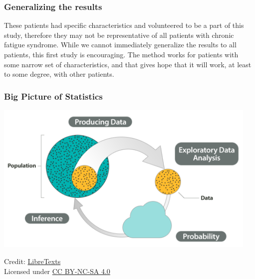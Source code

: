 \documentclass[slidestop,compress,mathserif]{beamer}
\begin{document}
\begin{frame}
\frametitle{Generalizing the results}



These patients had specific characteristics and volunteered to be a part of this study, therefore they may not be representative of all patients with chronic fatigue syndrome. While we cannot immediately generalize the results to all patients, this first study is encouraging. The method works for patients with some narrow set of characteristics, and that gives hope that it will work, at least to some degree, with other patients.


\end{frame}


\begin{frame}
    \frametitle{Big Picture of Statistics}
    \begin{center}
        \includegraphics[width=0.95\textwidth]{BigPicture1.png}
    \end{center}
    \vspace{0.5em}
    \footnotesize
    Credit: \href{https://stats.libretexts.org/Bookshelves/Applied_Statistics/Biostatistics_-_Open_Learning_Textbook/Preliminaries/The_Big_Picture}{LibreTexts}
    \\
    Licensed under \href{https://creativecommons.org/licenses/by-nc-sa/4.0/}{CC BY-NC-SA 4.0}
\end{frame}
\end{document}
